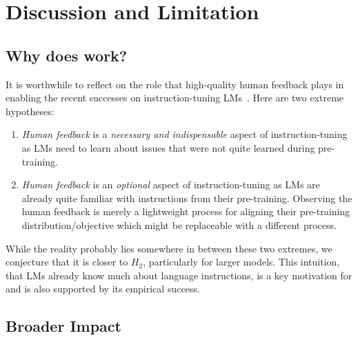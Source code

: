\section{Discussion and Limitation}

\subsection{Why does \name{} work?}
It is worthwhile to  reflect on the role that high-quality human feedback plays 
in enabling the recent successes on instruction-tuning LMs~\cite{mishra2022cross,wang2022benchmarking,wei2022finetuned,sanh2022multitask,ouyang2022training}. 
Here are two extreme hypotheses: 

\newcommand{\subscript}[2]{$#1 _ #2$}
\begin{enumerate}[label=(\subscript{H}{{\arabic*}})]
    \item  \emph{Human feedback} is a \emph{necessary and indispensable} aspect of instruction-tuning as LMs need to learn about issues that were not quite learned during pre-training. 
    \item  \emph{Human feedback} is an \emph{optional} aspect of instruction-tuning as LMs are already quite familiar with instructions  from their pre-training. Observing the human feedback is merely a lightweight process for aligning their pre-training distribution/objective which might be replaceable with a different process. 
\end{enumerate}
While the reality probably lies somewhere in between these two extremes, we conjecture 
that it is closer to \subscript{H}{2}, particularly for larger models.
This intuition, that LMs already know much about language instructions, is a key motivation for \name{} and is also supported by its  empirical success.


\subsection{Broader Impact}

